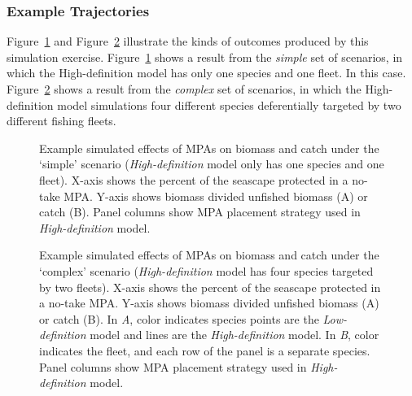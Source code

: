 \documentclass[
  default,
  lineno,
  referee]{sn-jnl}
\begin{document}
\subsubsection{Example Trajectories}\label{sec-eg}

Figure~\ref{fig-eg-simple} and Figure~\ref{fig-eg-complex} illustrate
the kinds of outcomes produced by this simulation exercise.
Figure~\ref{fig-eg-simple} shows a result from the \emph{simple} set of
scenarios, in which the High-definition model has only one species and
one fleet. In this case. Figure~\ref{fig-eg-complex} shows a result from
the \emph{complex} set of scenarios, in which the High-definition model
simulations four different species deferentially targeted by two
different fishing fleets.

\begin{figure}


\caption{\label{fig-eg-simple}Example simulated effects of MPAs on
biomass and catch under the `simple' scenario (\emph{High-definition}
model only has one species and one fleet). X-axis shows the percent of
the seascape protected in a no-take MPA. Y-axis shows biomass divided
unfished biomass (A) or catch (B). Panel columns show MPA placement
strategy used in \emph{High-definition} model.}

\end{figure}%

\begin{figure}


\caption{\label{fig-eg-complex}Example simulated effects of MPAs on
biomass and catch under the `complex' scenario (\emph{High-definition}
model has four species targeted by two fleets). X-axis shows the percent
of the seascape protected in a no-take MPA. Y-axis shows biomass divided
unfished biomass (A) or catch (B). In \emph{A}, color indicates species
points are the \emph{Low-definition} model and lines are the
\emph{High-definition} model. In \emph{B}, color indicates the fleet,
and each row of the panel is a separate species. Panel columns show MPA
placement strategy used in \emph{High-definition} model.}

\end{figure}%
\end{document}
